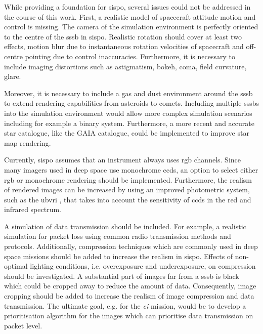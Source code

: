 While providing a foundation for \gls{sispo}, several issues could not be addressed in the course of this work. First, a realistic model of spacecraft attitude motion and control is missing. The camera of the simulation environment is perfectly oriented to the centre of the \gls{sssb} in \gls{sispo}. Realistic rotation should cover at least two effects, motion blur due to instantaneous rotation velocities of spacecraft and off-centre pointing due to control inaccuracies. Furthermore, it is necessary to include imaging distortions such as astigmatism, bokeh, coma, field curvature, glare.

Moreover, it is necessary to include a gas and dust environment around the \gls{sssb} to extend rendering capabilities from asteroids to comets. Including multiple \glspl{sssb} into the simulation environment would allow more complex simulation scenarios including  for example a binary system. Furthermore, a more recent and accurate star catalogue, like the GAIA catalogue, could be implemented to improve star map rendering.

Currently, \gls{sispo} assumes that an instrument always uses \gls{rgb} channels. Since many imagers used in deep space use monochrome \glspl{ccd}, an option to select either \gls{rgb} or monochrome rendering should be implemented. Furthermore, the realism of rendered images can be increased by using an improved photometric system, such as the \gls{ubvri} \cite{Bessell1993PhotometricSystems}, that takes into account the sensitivity of \glspl{ccd} in the red and infrared spectrum.

A simulation of data transmission should be included. For example, a realistic simulation for packet loss using common radio transmission methods and protocols. Additionally, compression techniques which are commonly used in deep space missions should be added to increase the realism in \gls{sispo}. Effects of non-optimal lighting conditions, i.e. overexposure and underexposure, on compression should be investigated. A substantial part of images far from a \gls{sssb} is black which could be cropped away to reduce the amount of data. Consequently, image cropping should be added to increase the realism of image compression and data transmission. The ultimate goal, e.g. for the \textit{\gls{ci}} mission, would be to develop a prioritisation algorithm for the images which can prioritise data transmission on packet level.

